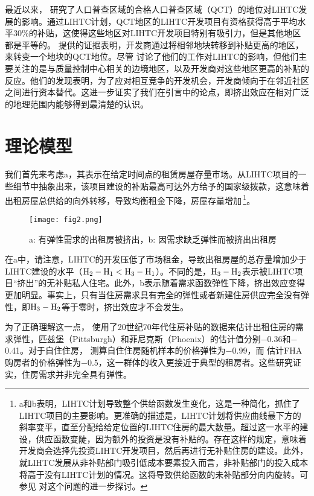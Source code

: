 \documentclass[lang=cn,11pt,a4paper]{paper}
\begin{document}
最近以来，\cite{Baum-Snow2009654} 研究了人口普查区域的合格人口普查区域（QCT）的地位对LIHTC发展的影响。通过LIHTC计划，QCT地区的LIHTC开发项目有资格获得高于平均水平30\%的补贴，这使得这些地区对LIHTC开发项目特别有吸引力，但是其他地区都是平等的。\cite{Baum-Snow2009654} 提供的证据表明，开发商通过将相邻地块转移到补贴更高的地区，来转变一个地块的QCT地位。尽管 \cite{Baum-Snow2009654} 讨论了他们的工作对LIHTC的影响，但他们主要关注的是与质量控制中心相关的边境地区，以及开发商对这些地区更高的补贴的反应。他们的发现表明，为了应对相互竞争的开发机会，开发商倾向于在邻近社区之间进行资本替代。这进一步证实了我们在引言中的论点，即挤出效应在相对广泛的地理范围内能够得到最清楚的认识。

\section{理论模型}\label{sec3}

我们首先来考虑a，其表示在给定时间点的租赁房屋存量市场。从LIHTC项目的一些细节中抽象出来，该项目建设的补贴最高可达外方给予的国家级拨款，这意味着出租房屋总供给的向外转移，导致均衡租金下降，房屋存量增加\,\footnote{a和b表明，LIHTC计划导致整个供给函数发生变化，这是一种简化，抓住了LIHTC项目的主要影响。更准确的描述是，LIHTC计划将供应曲线最下方的斜率变平，直至分配给给定位置的LIHTC住房的最大数量。超过这一水平的建设，供应函数变陡，因为额外的投资是没有补贴的。存在这样的规定，意味着开发商会选择先投资LIHTC开发项目，然后再进行无补贴住房的建设。此外，就LIHTC发展从非补贴部门吸引低成本要素投入而言，非补贴部门的投入成本将高于没有LIHTC计划的情况。这将导致供给函数的未补贴部分向内旋转。可参见 \cite{Olsen2007618} 对这个问题的进一步探讨。}。

\begin{figure}[h]
	\centering
	\texttt{[image: fig2.png]}
	\caption{a: 有弹性需求的出租房被挤出，b: 因需求缺乏弹性而被挤出出租房}\label{fig2}
\end{figure}

在a中，请注意，LIHTC的开发压低了市场租金，导致出租房屋的总存量增加少于LIHTC建设的水平（$\rm{H}_2-\rm{H}_1 < \rm{H}_3-\rm{H}_1$）。不同的是，$\rm{H}_3-\rm{H}_2$表示被LIHTC项目“挤出”的无补贴私人住宅。此外，b表示随着需求函数弹性下降，挤出效应变得更加明显。事实上，只有当住房需求具有完全的弹性或者新建住房供应完全没有弹性，即$\rm{H}_3-\rm{H}_2$等于零时，挤出效应才不会发生。

为了正确理解这一点，\cite{Hanushek1980449} 使用了20世纪70年代住房补贴的数据来估计出租住房的需求弹性，匹兹堡（Pittsburgh）和菲尼克斯（Phoenix）的估计值分别$-$0.36和$-$0.41。对于自住住房，\cite{Rosen19791} 测算自住住房随机样本的价格弹性为$-$0.99，而 \cite{Rosen19791} 估计FHA购房者的价格弹性为$-$0.5，这一群体的收入更接近于典型的租房者。这些研究证实，住房需求并非完全具有弹性。
\end{document}
